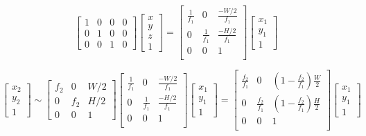 \documentclass{article}
\begin{document}
\begin{equation}
	\left[
		\begin{array}{cccc}
		1 & 0 & 0 & 0\\
		0 & 1 & 0 & 0\\
		0 & 0 & 1 & 0
		\end{array}
	\right]
	\left[
		\begin{array}{c}
		x\\
		y\\
		z\\
		1
		\end{array}
	\right]
	=
	\left[
		\begin{array}{ccc}
		\frac{1}{f_1} & 0 & \frac{-W/2}{f_1}\\
		0 & \frac{1}{f_1} & \frac{-H/2}{f_1}\\
		0 & 0 & 1\\
		\end{array}
	\right]	
	\left[
		\begin{array}{c}
		x_1\\
		y_1\\
		1
		\end{array}
	\right]
\end{equation}

\begin{equation}
	\left[
		\begin{array}{c}
		x_2 \\ y_2 \\ 1
		\end{array}
	\right] 
	\sim
	\left[
		\begin{array}{ccc}
		f_2 & 0 & W/2\\
		0 & f_2 & H/2\\
		0 & 0 & 1
		\end{array}
	\right]
	\left[
		\begin{array}{ccc}
		\frac{1}{f_1} & 0 & \frac{-W/2}{f_1}\\
		0 & \frac{1}{f_1} & \frac{-H/2}{f_1}\\
		0 & 0 & 1\\
		\end{array}
	\right]	
	\left[
		\begin{array}{c}
		x_1\\
		y_1\\
		1
		\end{array}
	\right]
	=
	\left[
		\begin{array}{ccc}
		\frac{f_2}{f_1} & 0 & \left(1 - \frac{f_2}{f_1}\right)\frac{W}{2}\\
		0 & \frac{f_2}{f_1} & \left(1 - \frac{f_2}{f_1}\right)\frac{H}{2}\\
		0 & 0 & 1\\
		\end{array}
	\right]	
	\left[
		\begin{array}{c}
		x_1\\
		y_1\\
		1
		\end{array}
	\right]
\end{equation}
\end{document}
